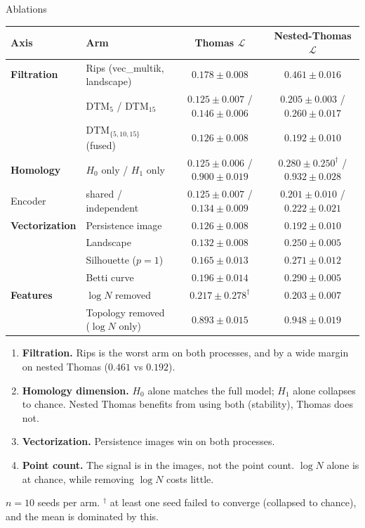 \documentclass[aspectratio=169,10pt]{beamer}
\newcommand{\Loss}{\mathcal{L}}
\newcommand{\DTM}{\mathrm{DTM}}
\begin{document}
\begin{frame}{Ablations}
\centering\scriptsize
\begin{tabular}{llcc}
\toprule
Axis & Arm & Thomas $\Loss$ & Nested-Thomas $\Loss$ \\
\midrule
\textbf{Filtration}    & Rips (vec\_multik, landscape) & $0.178 \pm 0.008$ & $0.461 \pm 0.016$ \\
              & $\DTM_5$ / $\DTM_{15}$ & $0.125 \pm 0.007$ / $0.146 \pm 0.006$ & $0.205 \pm 0.003$ / $0.260 \pm 0.017$ \\
              & $\DTM_{\{5,10,15\}}$ (fused) & $0.126 \pm 0.008$ & $0.192 \pm 0.010$ \\
\textbf{Homology}      & $H_0$ only / $H_1$ only & $0.125 \pm 0.006$ / $0.900 \pm 0.019$ & $0.280 \pm 0.250^{\dagger}$ / $0.932 \pm 0.028$ \\
{\color{cgray}Encoder}       & {\color{cgray}shared / independent} & {\color{cgray}$0.125 \pm 0.007$ / $0.134 \pm 0.009$} & {\color{cgray}$0.201 \pm 0.010$ / $0.222 \pm 0.021$} \\
\textbf{Vectorization} & Persistence image & $0.126 \pm 0.008$ & $0.192 \pm 0.010$ \\
              & Landscape & $0.132 \pm 0.008$ & $0.250 \pm 0.005$ \\
              & Silhouette ($p=1$) & $0.165 \pm 0.013$ & $0.271 \pm 0.012$ \\
              & Betti curve & $0.196 \pm 0.014$ & $0.290 \pm 0.005$ \\
\textbf{Features}      & $\log N$ removed & $0.217 \pm 0.278^{\dagger}$ & $0.203 \pm 0.007$ \\
              & Topology removed ($\log N$ only) & $0.893 \pm 0.015$ & $0.948 \pm 0.019$ \\
\bottomrule
\end{tabular}
\vspace{8pt}

\raggedright\footnotesize
\begin{enumerate}\setlength\itemsep{2pt}
  \item \textbf{Filtration.} Rips is the worst arm on both
        processes, and by a wide margin on nested Thomas
        ($0.461$ vs $0.192$).
  \item \textbf{Homology dimension.} $H_0$ alone matches the full model;
        $H_1$ alone collapses to chance. Nested Thomas benefits from
        using both (stability), Thomas does not.
  \item \textbf{Vectorization.} Persistence images win on both processes.
  \item \textbf{Point count.} The signal is in the images, not the point count. $\log N$
        alone is at chance, while removing $\log N$ costs little.
\end{enumerate}
\vspace{2pt}
{\color{cgray}\scriptsize $n=10$ seeds per arm. $^{\dagger}$ at least one seed
failed to converge (collapsed to chance), and the mean is dominated by this.}
\end{frame}
\end{document}
